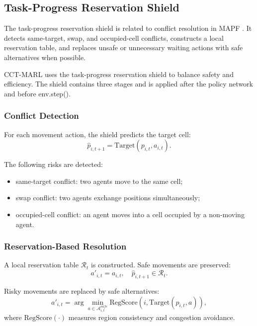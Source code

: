\documentclass[preprint,12pt]{elsarticle}
\begin{document}
\subsection{Task-Progress Reservation Shield}

The task-progress reservation shield is related to conflict resolution in MAPF \cite{Sharon2015CBS,Stern2019MAPF,Li2021LifelongMAPF}. It detects same-target, swap, and occupied-cell conflicts, constructs a local reservation table, and replaces unsafe or unnecessary waiting actions with safe alternatives when possible.

CCT-MARL uses the task-progress reservation shield to balance safety and efficiency. The shield contains three stages and is applied after the policy network and before env.step().

\subsubsection{Conflict Detection}

For each movement action, the shield predicts the target cell:
\begin{equation}
\hat{p}_{i,t+1}
=
\mathrm{Target}(p_{i,t}, a_{i,t}).
\end{equation}

The following risks are detected:
\begin{itemize}
    \item same-target conflict: two agents move to the same cell;
    \item swap conflict: two agents exchange positions simultaneously;
    \item occupied-cell conflict: an agent moves into a cell occupied by a non-moving agent.
\end{itemize}

\subsubsection{Reservation-Based Resolution}

A local reservation table $\mathcal{R}_t$ is constructed. Safe movements are preserved:
\begin{equation}
a'_{i,t} = a_{i,t}, \quad
\hat{p}_{i,t+1} \in \mathcal{R}_t.
\end{equation}

Risky movements are replaced by safe alternatives:
\begin{equation}
a'_{i,t}
=
\arg\min_{a \in \mathcal{A}^{safe}_{i,t}}
\mathrm{RegScore}
\left(
i,
\mathrm{Target}(p_{i,t},a)
\right),
\end{equation}
where $\mathrm{RegScore}(\cdot)$ measures region consistency and congestion avoidance.
\end{document}
